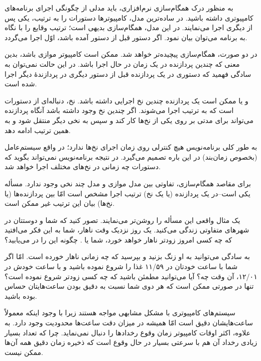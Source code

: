 \documentclass{book}
\begin{document}
    به منظور درک همگام‌سازی نرم‌افزاری، باید مدلی از چگونگی اجرای برنامه‌های کامپیوتری داشته باشید.
    در ساده‌ترین مدل، کامپیوترها دستورات را به ترتیب، یکی پس از دیگری اجرا می‌نمایند. 
    در این مدل، همگام‌سازی بدیهی است؛‌ ترتیب وقایع را با نگاه به  برنامه می‌توان بیان نمود. 
    اگر دستور  قبل از دستور  آمده باشد، اوّل اجرا می‌گردد. 

    در دو صورت، همگام‌سازی پیچیده‌تر خواهد شد. 
    ممکن است کامپیوتر موازی باشد، بدین معنی که چندین پردازنده در یک زمان در حال اجرا باشد. 
    در این حالت نمی‌توان به سادگی فهمید که 
    دستوری در یک پردازنده قبل از دستور دیگری در پردازندهٔ دیگر اجرا شده است. 

    و یا ممکن است یک پردازنده چندین نخ  اجرایی داشته باشد. نخ، دنباله‌ای از دستورات است که به ترتیب اجرا می‌شوند. 
    اگر چندین نخ وجود داشته باشد آنگاه پردازنده می‌تواند برای مدتی بر روی یکی  از نخ‌ها کار کند و سپس به نخی دیگر منتقل شود و به همین 
    ترتیب ادامه دهد. 

    به طور کلی برنامه‌نویس هیچ کنترلی روی زمان اجرای نخ‌ها ندارد؛ در واقع سیستم‌عامل (بخصوص زمان‌بند) در این باره تصمیم‌ می‌گیرد. 
    در نتیجه برنامه‌نویس نمی‌تواند بگوید که دستورات چه زمانی در نخ‌های مختلف اجرا خواهد شد.
    
    برای مقاصد همگام‌سازی، تفاوتی بین مدل موازی و مدل چند نخی وجود ندارد. 
    مسأله یکی است--در یک پردازنده (یا یک نخ) ترتیب اجرا مشخص است امّا بین پردازنده‌ها (یا نخ‌ها) بیان این ترتیب غیر ممکن است. 
    
    یک مثال واقعی این مسأله را روشن‌تر می‌نمایند. 
    تصور کنید که شما و دوستتان  در شهرهای متفاوتی زندگی می‌کنید. یک روز نزدیک وقت ناهار، شما به این فکر می‌افتید که 
    چه کسی امروز زودتر ناهار خواهد خورد، شما یا . چگونه این را در می‌یابید؟ 

    به سادگی می‌توانید به او زنگ بزنید و بپرسید که چه زمانی ناهار خورده است. امّا اگر شما با ساعت خودتان در ۱۱/۵۹ غذا را شروع نموده باشید 
    و  با ساعت خودش در ۱۲/۰۱، آن وقت چه؟ آیا می‌توانید مطمئن باشید که چه کسی زودتر شروع نموده است؟ 
    تنها در صورتی ممکن است که هر دوی شما نسبت به دقیق بودن ساعت‌هایتان حساس بوده باشید.

    سیستم‌های کامپیوتری با مشکل مشابهی مواجه هستند زیرا با وجود اینکه معمولاً ساعت‌هایشان دقیق است امّا همیشه 
    در میزان دقت ساعت‌ها محدودیت وجود دارد. به علاوه، اکثر اوقات کامپیوتر زمان وقوع رخدادها را دنبال نمی‌نماید. 
    چرا که تعداد بسیار زیادی رخداد آن هم با سرعتی بسیار در حال وقوع است که ذخیره  زمان دقیق همه آن‌ها ممکن نیست. 
    
\end{document}
